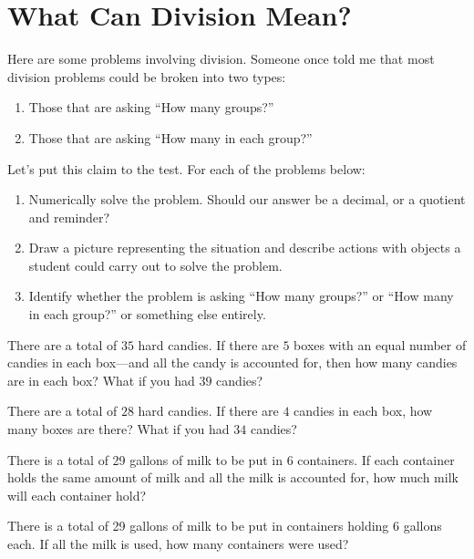 \newpage
\section{What Can Division Mean?}\label{A:dm}

Here are some problems involving division. Someone once told me that
most division problems could be broken into two types:
\begin{enumerate}
\item Those that are asking ``How many groups?''
\item Those that are asking ``How many in each group?''
\end{enumerate}
Let's put this claim to the test. For each of the problems below:
\begin{enumerate}
\item Numerically solve the problem. Should our answer be a decimal, or a quotient and reminder?
\item Draw a picture representing the situation and describe actions with objects a student could carry out to solve the problem.
\item Identify whether the problem is asking ``How many groups?'' or ``How many in each group?'' or something else entirely.
\end{enumerate}

\begin{prob}
There are a total of $35$ hard candies. If there are $5$ boxes with an
equal number of candies in each box---and all the candy is accounted
for, then how many candies are in each box? What if you had $39$
candies?
\end{prob}

\begin{prob}
There are a total of $28$ hard candies. If there are $4$ candies in
each box, how many boxes are there? What if you had $34$ candies?
\end{prob}


\begin{prob}
There is a total of 29 gallons of milk to be put in 6 containers.  If
each container holds the same amount of milk and all the milk is
accounted for, how much milk will each container hold?
\end{prob}

 
\begin{prob}
There is a total of 29 gallons of milk to be put in containers holding
6 gallons each.  If all the milk is used, how many containers were
used?
\end{prob}
 
